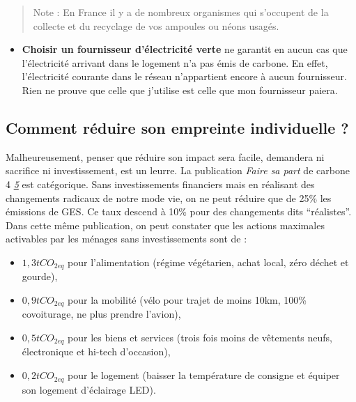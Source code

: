 \begin{quote}
Note : En France il y a de nombreux organismes qui s'occupent de la
collecte et du recyclage de vos ampoules ou néons usagés.
\end{quote}

\begin{itemize}
\tightlist
\item
  \textbf{Choisir un fournisseur d'électricité verte} ne garantit en
  aucun cas que l'électricité arrivant dans le logement n'a pas émis de
  carbone. En effet, l'électricité courante dans le réseau n'appartient
  encore à aucun fournisseur. Rien ne prouve que celle que j'utilise est
  celle que mon fournisseur paiera.
\end{itemize}

\hypertarget{comment-ruxe9duire-son-empreinte-individuelle}{%
\subsection{Comment réduire son empreinte individuelle
?}\label{comment-ruxe9duire-son-empreinte-individuelle}}

Malheureusement, penser que réduire son impact sera facile, demandera ni
sacrifice ni investissement, est un leurre. La publication \emph{Faire
sa part} de carbone 4
\emph{\href{https://www.carbone4.com/publication-faire-sa-part}{5}} est
catégorique. Sans investissements financiers mais en réalisant des
changements radicaux de notre mode vie, on ne peut réduire que de 25\%
les émissions de GES. Ce taux descend à 10\% pour des changements dits
``réalistes''. Dans cette même publication, on peut constater que les
actions maximales activables par les ménages sans investissements sont
de :

\begin{itemize}
\tightlist
\item
  \(1,3 tCO_{2eq}\) pour l'alimentation (régime végétarien, achat local,
  zéro déchet et gourde),
\item
  \(0,9 tCO_{2eq}\) pour la mobilité (vélo pour trajet de moins 10km,
  100\% covoiturage, ne plus prendre l'avion),
\item
  \(0,5 tCO_{2eq}\) pour les biens et services (trois fois moins de
  vêtements neufs, électronique et hi-tech d'occasion),
\item
  \(0,2 tCO_{2eq}\) pour le logement (baisser la température de consigne
  et équiper son logement d'éclairage LED).
\end{itemize}

